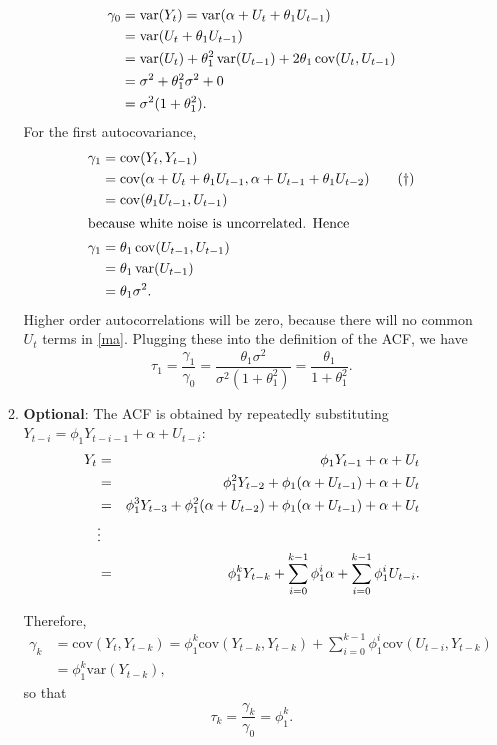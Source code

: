 \documentclass[11pt, a4paper]{article}
\def\func#1{\mathop{\rm #1}}
\begin{document}
\begin{enumerate}
\begin{enumerate}
\begin{align*}
\gamma_0&=\func{var}(Y_t)=\func{var}(\alpha + U_t + \theta_1 U_{t-1})\\
&=\func{var}(U_t + \theta_1 U_{t-1})\\
&=\func{var}(U_t) + \theta_1^2\func{var}( U_{t-1})+2\theta_1\func{cov}(U_t, U_{t-1})\\
&=\sigma^2+\theta_1^2\sigma^2+0\\
&=\sigma^2(1+\theta_1^2).
\end{align*}
For the first autocovariance,
\begin{align*}
\gamma_1&=\func{cov}(Y_t, Y_{t-1})\\
&=\func{cov}(\alpha + U_t + \theta_1 U_{t-1}, \alpha + U_{t-1} + \theta_1 U_{t-2})\tag{$\dagger$}\label{ma}\\
&=\func{cov}(\theta_1 U_{t-1},U_{t-1})\\
\intertext{because white noise is uncorrelated. Hence}
\gamma_1&=\theta_1\func{cov}( U_{t-1},U_{t-1})\\
&=\theta_1\func{var}(U_{t-1})\\
&=\theta_1\sigma^2.
\end{align*}
Higher order autocorrelations will be zero, because there will no common $U_t$ terms in \eqref{ma}.
Plugging these into the definition of the ACF, we have
\[
\tau_1=\frac{\gamma_1}{\gamma_0}=\frac{\theta_1\sigma^2}{\sigma^2(1+\theta_1^2)}=\frac{\theta_1}{1+\theta_1^2}.
\]


\item \textbf{Optional}:
The ACF is obtained by repeatedly
substituting $Y_{t-i} = \phi_1 Y_{t-i-1} + \alpha + U_{t-i}$:
\begin{eqnarray}
Y_t &=&\phi_1 Y_{t-1}+ \alpha + U_t  \notag \\
&=&\phi_1 ^2Y_{t-2} + \phi_1 (\alpha + U_{t-1}) + \alpha + U_t  \notag \\
&=&\phi_1 ^3 Y_{t-3}+ \phi_1 ^2 (\alpha + U_{t-2} )+ \phi_1 (\alpha + U_{t-1})+
\alpha + U_t  \notag \\
&\vdots &  \notag \\
&=&\phi_1 ^k Y_{t-k}+\sum_{i=0}^{k-1}\phi_1 ^i \alpha + \sum_{i=0}^{k-1}\phi_1
^i U_{t-i}.  \label{subst}
\end{eqnarray}

Therefore,
\begin{align*}
\gamma_k &= \mathrm{cov}(Y_t,Y_{t-k}) = \phi_1 ^k \mathrm{cov}%
(Y_{t-k},Y_{t-k}) + \sum_{i=0}^{k-1}\phi_1 ^i \mathrm{cov}(U_{t-i},Y_{t-k})\\
&= \phi_1 ^k \mathrm{var}(Y_{t-k}),
\end{align*}
so that
\begin{equation*}
\tau_k = \frac{\gamma_k}{\gamma_0} = \phi_1 ^k.
\end{equation*}

\end{enumerate}
\end{enumerate}
\end{document}
